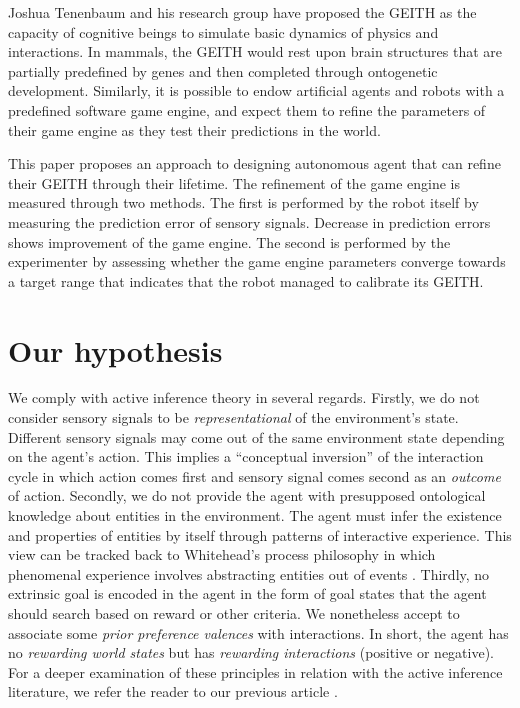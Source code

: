 \documentclass[runningheads]{llncs}
\begin{document}
Joshua Tenenbaum and his research group have proposed the GEITH \cite{battaglia_simulation_2013} as the capacity of cognitive beings to simulate basic dynamics of physics and interactions. 
In mammals, the GEITH would rest upon brain structures that are partially predefined by genes and then completed through ontogenetic development.  
Similarly, it is possible to endow artificial agents and robots with a predefined software game engine, and expect them to refine the parameters of their game engine as they test their predictions in the world.

This paper proposes an approach to designing autonomous agent that can refine their GEITH through their lifetime.
The refinement of the game engine is measured through two methods. 
The first is performed by the robot itself by measuring the prediction error of sensory signals. 
Decrease in prediction errors shows improvement of the game engine. 
The second is performed by the experimenter by assessing whether the game engine parameters converge towards a target range that indicates that the robot managed to calibrate its GEITH. 




\section{Our hypothesis}

We comply with active inference theory in several regards. 
Firstly, we do not consider sensory signals to be \textit{representational} of the environment's state. 
Different sensory signals may come out of the same environment state depending on the agent's action. 
This implies a ``conceptual inversion'' of the interaction cycle in which action comes first and sensory signal comes second as an  \textit{outcome} of action. 
Secondly, we do not provide the agent with presupposed ontological knowledge about entities in the environment. 
The agent must infer the existence and properties of entities by itself through patterns of interactive experience. 
This view can be tracked back to Whitehead's process philosophy in which phenomenal experience involves abstracting entities out of events \cite{whitehead1929}. 
Thirdly, no extrinsic goal is encoded in the agent in the form of goal states that the agent should search based on reward or other criteria. 
We nonetheless accept to associate some \textit{prior preference valences} with interactions. 
In short, the agent has no \textit{rewarding world states} but has \textit{rewarding interactions} (positive or negative).
For a deeper examination of these principles in relation with the active inference literature, we refer the reader to our previous article \cite{georgeon_artificial_2024}.
\end{document}
